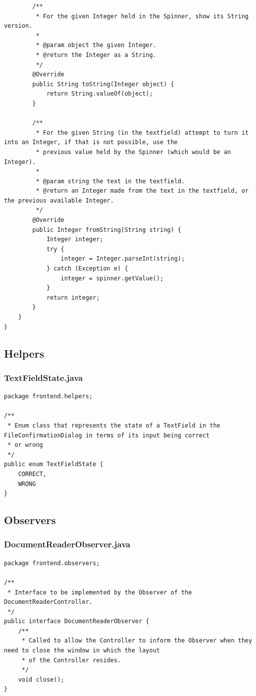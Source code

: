 \begin{lstlisting}
        /**
         * For the given Integer held in the Spinner, show its String version.
         *
         * @param object the given Integer.
         * @return the Integer as a String.
         */
        @Override
        public String toString(Integer object) {
            return String.valueOf(object);
        }

        /**
         * For the given String (in the textfield) attempt to turn it into an Integer, if that is not possible, use the
         * previous value held by the Spinner (which would be an Integer).
         *
         * @param string the text in the textfield.
         * @return an Integer made from the text in the textfield, or the previous available Integer.
         */
        @Override
        public Integer fromString(String string) {
            Integer integer;
            try {
                integer = Integer.parseInt(string);
            } catch (Exception e) {
                integer = spinner.getValue();
            }
            return integer;
        }
    }
}
\end{lstlisting}

\subsection{Helpers}
\subsubsection{TextFieldState.java}
\begin{lstlisting}
package frontend.helpers;

/**
 * Enum class that represents the state of a TextField in the FileConfirmationDialog in terms of its input being correct
 * or wrong
 */
public enum TextFieldState {
    CORRECT,
    WRONG
}
\end{lstlisting}
\subsection{Observers}
\subsubsection{DocumentReaderObserver.java}
\begin{lstlisting}
package frontend.observers;

/**
 * Interface to be implemented by the Observer of the DocumentReaderController.
 */
public interface DocumentReaderObserver {
    /**
     * Called to allow the Controller to inform the Observer when they need to close the window in which the layout
     * of the Controller resides.
     */
    void close();
}
\end{lstlisting}
